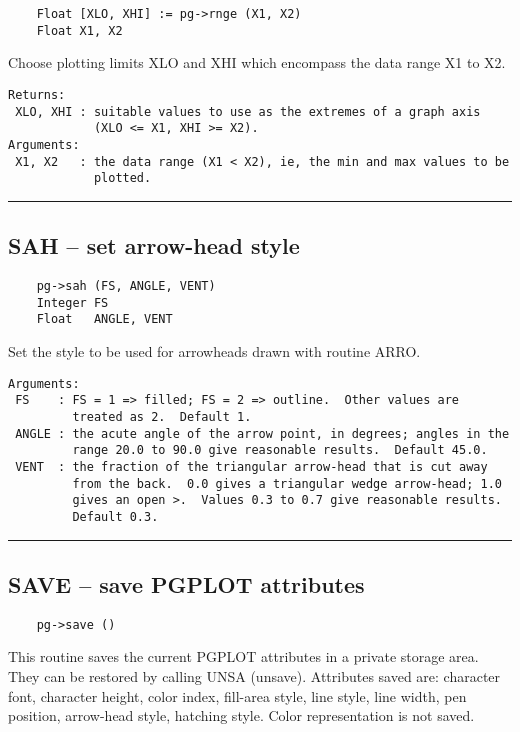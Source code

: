 \begin{verbatim}
    Float [XLO, XHI] := pg->rnge (X1, X2)
    Float X1, X2
\end{verbatim}

Choose plotting limits XLO and XHI which encompass the data range X1
to X2.

\begin{verbatim}
Returns:
 XLO, XHI : suitable values to use as the extremes of a graph axis
            (XLO <= X1, XHI >= X2). 
Arguments:
 X1, X2   : the data range (X1 < X2), ie, the min and max values to be
            plotted.  
\end{verbatim}

\hrule

\subsection*{SAH -- set arrow-head style }

\begin{verbatim}
    pg->sah (FS, ANGLE, VENT)
    Integer FS
    Float   ANGLE, VENT
\end{verbatim}

Set the style to be used for arrowheads drawn with routine ARRO.

\begin{verbatim}
Arguments:
 FS    : FS = 1 => filled; FS = 2 => outline.  Other values are
         treated as 2.  Default 1. 
 ANGLE : the acute angle of the arrow point, in degrees; angles in the
         range 20.0 to 90.0 give reasonable results.  Default 45.0. 
 VENT  : the fraction of the triangular arrow-head that is cut away
         from the back.  0.0 gives a triangular wedge arrow-head; 1.0
         gives an open >.  Values 0.3 to 0.7 give reasonable results.
         Default 0.3. 
\end{verbatim}

\hrule

\subsection*{SAVE -- save PGPLOT attributes }

\begin{verbatim}
    pg->save ()
\end{verbatim}

This routine saves the current PGPLOT attributes in a private storage
area.  They can be restored by calling UNSA (unsave).  Attributes
saved are: character font, character height, color index, fill-area
style, line style, line width, pen position, arrow-head style,
hatching style.  Color representation is not saved.

